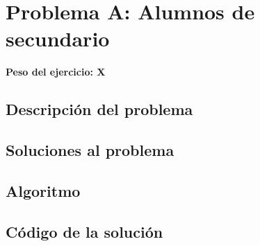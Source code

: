 \newpage{}
\section{Problema A: Alumnos de secundario}
\textbf{Peso del ejercicio: X}
\subsection{Descripción del problema}
\subsection{Soluciones al problema}
\subsection{Algoritmo}
\newpage
\subsection{Código de la solución}
%
